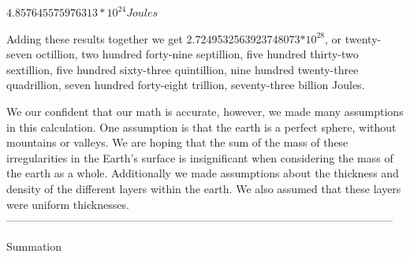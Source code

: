 \documentclass[a4paper, 11pt, oneside]{book} %
\begin{document}
\vspace{0.5\baselineskip} %
\vspace{0.5\baselineskip} %

$4.857645575976313*10^{24} Joules$

\vspace{0.5\baselineskip} %
\vspace{0.5\baselineskip} %
Adding these results together we get 2.7249532563923748073$*10^{28}$, or twenty-seven octillion, two hundred forty-nine septillion, five hundred thirty-two sextillion, five hundred sixty-three quintillion, nine hundred twenty-three quadrillion, seven hundred forty-eight trillion, seventy-three billion Joules.\\

\vspace{0.5\baselineskip} %
\vspace{0.5\baselineskip} %

We our confident that our math is accurate, however, we made many assumptions in this calculation. One assumption is that the earth is a perfect sphere, without mountains or valleys. We are hoping that the sum of the mass of these irregularities in the Earth's surface is insignificant when considering the mass of the earth as a whole. Additionally we made assumptions about the thickness and density of the different layers within the earth. We also assumed that these layers were uniform thicknesses.\\

\vspace{0.5\baselineskip} %
\vspace{0.5\baselineskip} %
---------------------------------------------------------------------------------------------------------
\vspace{0.5\baselineskip} %
\vspace{0.5\baselineskip} %

{\LARGE Summation \\} %
\vspace{0.5\baselineskip} %
\vspace{0.5\baselineskip} %
\end{document}

